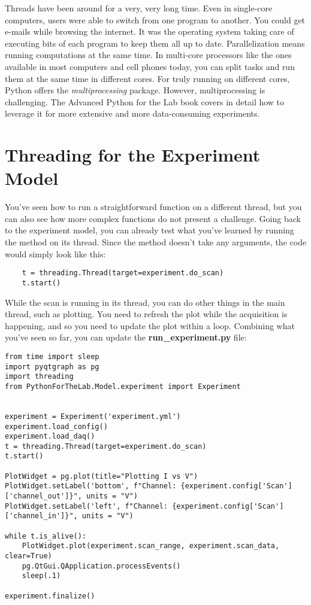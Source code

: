 Threads have been around for a very, very long time. Even in single-core computers, users were able to switch from one program to another. You could get e-mails while browsing the internet. It was the operating system taking care of executing bits of each program to keep them all up to date. Parallelization means running computations at the same time. In multi-core processors like the ones available in most computers and cell phones today, you can split tasks and run them at the same time in different cores. For truly running on different cores, Python offers the \emph{multiprocessing} package. However, multiprocessing is challenging. The Advanced Python for the Lab book covers in detail how to leverage it for more extensive and more data-consuming experiments.

\section{Threading for the Experiment Model}\label{sec:threads-experiment-model}
You've seen how to run a straightforward function on a different thread, but you can also see how more complex functions do not present a challenge. Going back to the experiment model, you can already test what you've learned by running the  method on its thread. Since the method doesn't take any arguments, the code would simply look like this:

\begin{verbatim}
    t = threading.Thread(target=experiment.do_scan)
    t.start()
\end{verbatim}

While the scan is running in its thread, you can do other things in the main thread, such as plotting. You need to refresh the plot while the acquisition is happening, and so you need to update the plot within a loop. Combining what you've seen so far, you can update the \textbf{run\_experiment.py} file:

\begin{verbatim}
from time import sleep
import pyqtgraph as pg
import threading
from PythonForTheLab.Model.experiment import Experiment


experiment = Experiment('experiment.yml')
experiment.load_config()
experiment.load_daq()
t = threading.Thread(target=experiment.do_scan)
t.start()

PlotWidget = pg.plot(title="Plotting I vs V")
PlotWidget.setLabel('bottom', f"Channel: {experiment.config['Scan']['channel_out']}", units = "V")
PlotWidget.setLabel('left', f"Channel: {experiment.config['Scan']['channel_in']}", units = "V")

while t.is_alive():
    PlotWidget.plot(experiment.scan_range, experiment.scan_data, clear=True)
    pg.QtGui.QApplication.processEvents()
    sleep(.1)

experiment.finalize()
\end{verbatim}

